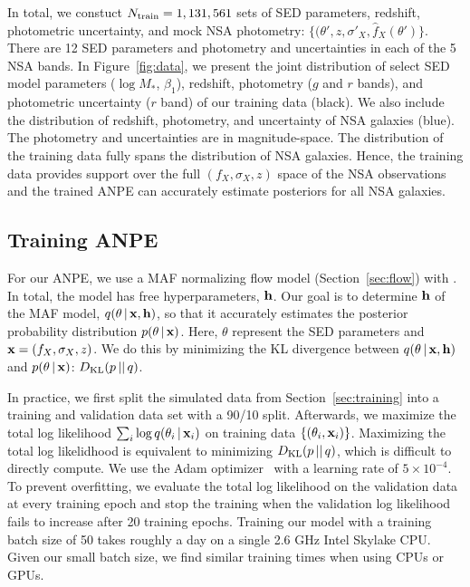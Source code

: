 In total, we constuct $N_{\rm train} = 1,131,561$ sets of SED parameters,
redshift, photometric uncertainty, and mock NSA photometry: 
$\{(\theta', z, \sigma'_X, \hat{f}_X(\theta') \}$.
There are 12 SED parameters and photometry and uncertainties in each of the 5
NSA bands. 
In Figure~\ref{fig:data}, we present the joint distribution of select SED model
parameters ($\log M_*$, $\beta_1$), redshift, photometry ($g$ and $r$ bands),
and photometric uncertainty ($r$ band) of our training data (black).
We also include the distribution of redshift, photometry, and uncertainty of
NSA galaxies (blue).
The photometry and uncertainties are in magnitude-space. 
The distribution of the training data fully spans the distribution of NSA
galaxies.
Hence, the training data provides support over the full $(f_X, \sigma_X, z)$
space of the NSA observations and the trained ANPE can accurately estimate
posteriors for all NSA galaxies. 

\subsection{Training ANPE} \label{sec:anpe_train}
For our ANPE, we use a MAF normalizing flow model (Section~\ref{sec:flow}) with 
.
In total, the model has  free hyperparameters, ${\bf h}$. 
Our goal is to determine ${\bf h}$ of the MAF model, 
$q(\theta\,|\, {\bf x}, {\bf h})$, so that it accurately estimates the
posterior probability distribution $p(\theta\,|\, {\bf x})$. 
Here, $\theta$ represent the SED parameters and ${\bf x} = (f_X, \sigma_X, z)$.
We do this by minimizing the KL divergence between 
$q(\theta\,|\,{\bf x}, {\bf h})$ and $p(\theta\,|\,{\bf x})$:
$D_{\rm KL} (p\,||\,q)$. 

In practice, we first split the simulated data from Section~\ref{sec:training}
into a training and validation data set with a 90/10 split. 
Afterwards, we maximize the total log likelihood $\sum_i \log q(\theta_i\,|\,
{\bf x}_i)$ on training data $\{(\theta_i, {\bf x}_i)\}$. 
Maximizing the total log likelidhood is equivalent to minimizing 
$D_{\rm KL} (p\,||\,q)$, which is difficult to directly compute.
We use the {\sc Adam} optimizer~\citep{kingma2017} with a learning rate of $5\times10^{-4}$. 
To prevent overfitting, we evaluate the total log likelihood on the validation
data at every training epoch and stop the training when the validation log
likelihood fails to increase after 20 training epochs.  
Training our model with a training batch size of 50 takes roughly a day on a
single 2.6 GHz Intel Skylake CPU. 
Given our small batch size, we find similar training times when using CPUs or
GPUs. 
